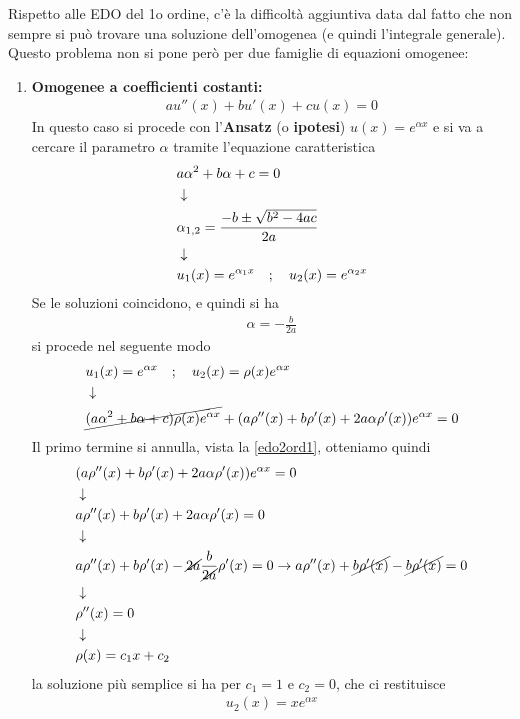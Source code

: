 Rispetto alle EDO del 1o ordine, c'è la difficoltà aggiuntiva data dal fatto che non sempre si può trovare una soluzione dell'omogenea (e quindi l'integrale generale). Questo problema non si pone però per due famiglie di equazioni omogenee:
\begin{enumerate}
	\item \textbf{Omogenee a coefficienti costanti:}
	\begin{align}
		a u''(x) + b u'(x) + c u(x) = 0 \label{edo2ord1}
	\end{align}
	In questo caso si procede con l'\textbf{Ansatz} (o \textbf{ipotesi}) $u(x) = e^{\alpha x}$ e si va a cercare il parametro $\alpha$ tramite l'equazione caratteristica
	\begin{align}
		&a \alpha^2 + b \alpha + c = 0\\ &\downarrow \nonumber \\
		& \alpha_{1,2} = \frac{-b \pm \sqrt{b^2 - 4ac}}{2a} \\ &\downarrow \nonumber \\
		&u_1(x) = e^{\alpha_1 x} \quad ; \quad u_2(x) = e^{\alpha_2 x}
	\end{align}
	Se le soluzioni coincidono, e quindi si ha
	\begin{align}
		\alpha = -\frac{b}{2a}
	\end{align}
	si procede nel seguente modo
	\begin{align}
		&u_1(x) = e^{\alpha x} \quad ; \quad u_2(x) = \rho(x)e^{\alpha x} \\ &\downarrow \nonumber \\
		&\cancel{(a \alpha^2 + b \alpha + c)\rho(x)e^{\alpha x}} + (a \rho''(x) + b \rho'(x) + 2a\alpha \rho'(x))e^{\alpha x} = 0
	\end{align}
	Il primo termine si annulla, vista la \ref{edo2ord1}, otteniamo quindi
	\begin{align}
		&(a \rho''(x) + b \rho'(x) + 2a\alpha \rho'(x))e^{\alpha x} = 0\\ &\downarrow \nonumber \\
		&a \rho''(x) + b \rho'(x) + 2a\alpha \rho'(x)=0 \nonumber \\ &\downarrow \nonumber \\
		&a \rho''(x) + b \rho'(x) - \cancel{2a}\frac{b}{\cancel{2a}} \rho'(x)=0 \to a \rho''(x) + \cancel{b \rho'(x)} - \cancel{b\rho'(x)} =0 \nonumber \\ &\downarrow \nonumber \\
		&\rho''(x) = 0 \nonumber \\ &\downarrow \nonumber \\
		&\rho(x) = c_1x + c_2
	\end{align}
	la soluzione più semplice si ha per $c_1 = 1$ e $c_2 = 0$, che ci restituisce
	\begin{align}
		u_2(x) = x e^{\alpha x}
	\end{align}


\end{enumerate}
